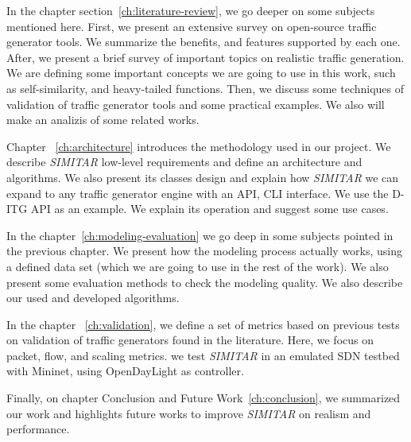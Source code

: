 In the chapter section~\ref{ch:literature-review}, we go deeper on some subjects mentioned here. First, we present an extensive survey on open-source traffic generator tools. We summarize the benefits, and features supported by each one. After, we present a brief survey of important topics on realistic traffic generation. We are defining some important concepts we are going to use in this work, such as self-similarity, and heavy-tailed functions. Then, we discuss some techniques of validation of traffic generator tools and some practical examples. We also will make an analizis of some related works. 

Chapter ~\ref{ch:architecture} introduces the methodology used in our project. We describe \textit{SIMITAR} low-level requirements and define an architecture and algorithms.  We also present its classes design and explain how \textit{SIMITAR} we can expand to any traffic generator engine with an API, CLI interface. We use the D-ITG API as an example. We explain its operation and suggest some use cases.

In the chapter~\ref{ch:modeling-evaluation} we go deep in some subjects pointed in the previous chapter. We present how the modeling process actually works, using a defined data set (which we are going to use in the rest of the work). We also present some evaluation methods to check the modeling quality. We also describe our used and developed algorithms.

In the chapter ~\ref{ch:validation}, we define a set of metrics based on previous tests on validation of traffic generators found in the literature. Here, we focus on packet, flow, and scaling metrics. we test \textit{SIMITAR} in an emulated SDN testbed with Mininet, using OpenDayLight as controller\cite{web-opendaylight}. 
 

Finally, on chapter Conclusion and Future Work~\ref{ch:conclusion}, we summarized our work and highlights future works to improve \textit{SIMITAR} on realism and performance.

